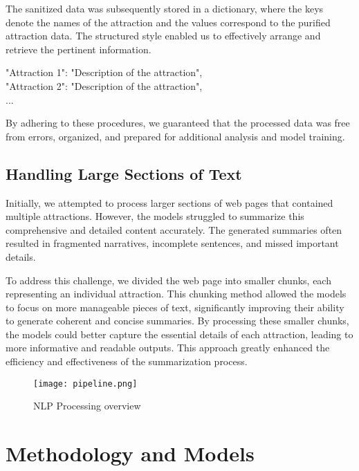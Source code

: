 \documentclass[conference]{IEEEtran}
\begin{document}
    The sanitized data was subsequently stored in a dictionary, where the keys denote the names of the attraction and the values correspond to the purified attraction data. The structured style enabled us to effectively arrange and retrieve the pertinent information.

    \begin{mdframed}[linewidth=1pt, innerleftmargin=15pt, innerrightmargin=15pt, innertopmargin=15pt, innerbottommargin=15pt]
    "Attraction 1": "Description of the attraction",\\
    "Attraction 2": "Description of the attraction",\\
    ...
    \end{mdframed}

    By adhering to these procedures, we guaranteed that the processed data was free from errors, organized, and prepared for additional analysis and model training.

    \subsection{Handling Large Sections of Text}
    Initially, we attempted to process larger sections of web pages that contained multiple attractions. However, the models struggled to summarize this comprehensive and detailed content accurately. The generated summaries often resulted in fragmented narratives, incomplete sentences, and missed important details.

    To address this challenge, we divided the web page into smaller chunks, each representing an individual attraction. This chunking method allowed the models to focus on more manageable pieces of text, significantly improving their ability to generate coherent and concise summaries. By processing these smaller chunks, the models could better capture the essential details of each attraction, leading to more informative and readable outputs. This approach greatly enhanced the efficiency and effectiveness of the summarization process.
    \begin{figure}
        \centering
        \texttt{[image: pipeline.png]}
        \caption{NLP Processing overview}
        \label{fig:pioverview}
    \end{figure}

\section{Methodology and Models}
\end{document}
